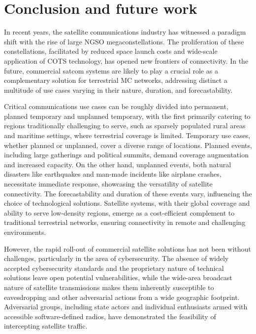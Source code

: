\documentclass[english, 12pt, a4paper, elec, utf8, a-1b, online]{aaltothesis}
\begin{document}
\clearpage

\section{Conclusion and future work}

In recent years, the satellite communications industry has witnessed a paradigm shift with the rise of large NGSO megaconstellations.
The proliferation of these constellations, facilitated by reduced space launch costs and wide-scale application of COTS technology, has opened new frontiers of connectivity.
In the future, commercial satcom systems are likely to play a crucial role as a complementary solution for terrestrial MC networks, addressing distinct a multitude of use cases varying in their nature, duration, and forecastability.

Critical communications use cases can be roughly divided into permanent, planned temporary and unplanned temporary, with the first primarily catering to regions traditionally challenging to serve, such as sparsely populated rural areas and maritime settings, where terrestrial coverage is limited. Temporary use cases, whether planned or unplanned, cover a diverse range of locations. Planned events, including large gatherings and political summits, demand coverage augmentation and increased capacity. On the other hand, unplanned events, both natural disasters like earthquakes and man-made incidents like airplane crashes, necessitate immediate response, showcasing the versatility of satellite connectivity. The forecastability and duration of these events vary, influencing the choice of technological solutions. Satellite systems, with their global coverage and ability to serve low-density regions, emerge as a cost-efficient complement to traditional terrestrial networks, ensuring connectivity in remote and challenging environments.

However, the rapid roll-out of commercial satellite solutions has not been without challenges, particularly in the area of cybersecurity.
The absence of widely accepted cybersecurity standards and the proprietary nature of technical solutions leave open potential vulnerabilities, while the wide-area broadcast nature of satellite transmissions makes them inherently susceptible to eavesdropping and other adversarial actions from a wide geographic footprint.
Adversarial groups, including state actors and individual enthusiasts armed with accessible software-defined radios, have demonstrated the feasibility of intercepting satellite traffic.
\end{document}
